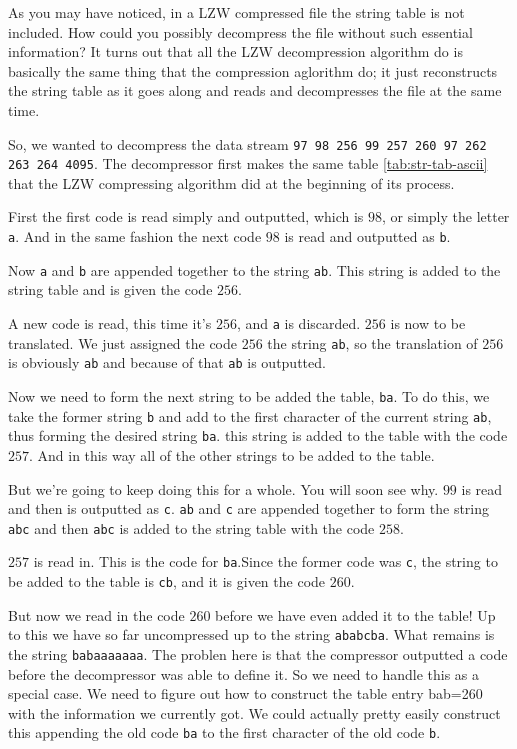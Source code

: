 \begin{refsection}
As you may have noticed, in a LZW compressed file the string table is
not included. How could you possibly decompress the file without such
essential information? It turns out that all the LZW decompression
algorithm do is basically the same thing that the compression aglorithm do; it
just reconstructs the string table as it goes along and  reads and decompresses the
file at the same time.

So, we wanted to decompress the data stream \texttt{97 98 256 99 257
  260 97 262 263 264 4095}. The decompressor first makes the same
table \ref{tab:str-tab-ascii}  that the LZW compressing algorithm did at the beginning of
its process.

First the first code is read simply and outputted, which is $98$, or
simply the letter \texttt{a}. And in the same fashion the next code
$98$ is read and outputted as \texttt{b}.

Now \texttt{a} and \texttt{b} are appended together to the string
\texttt{ab}. This string is added to the string table and is given the
code $256$.

A new code is read, this time it's $256$, and \texttt{a} is
discarded. $256$ is now to be translated. We just assigned the code
$256$ the string \texttt{ab}, so the translation of $256$ is obviously
\texttt{ab} and because of that \texttt{ab} is outputted.

Now we need to form the next string to be added the table,
\texttt{ba}. To do this, we take the former string \texttt{b} and add
to the first character of the current string \texttt{ab}, thus forming
the desired string \texttt{ba}. this string is added to the table with
the code $257$. And in this way all of the other strings to be added
to the table.

But we're going to keep doing this for a whole. You will soon see
why. $99$ is read and then is outputted as \texttt{c}. \texttt{ab} and
\texttt{c} are appended together to form the string \texttt{abc} and then
\texttt{abc} is added to the string table with the code $258$.

$257$ is read in. This is the code for \texttt{ba}.Since the former
code was \texttt{c}, the string to be added to the table is
\texttt{cb}, and it is given the code $260$.

But now we read in the code $260$ before we have even added it to the
table! Up to this we have so far uncompressed up to the string
\texttt{ababcba}. What remains is the string \texttt{babaaaaaaa}. The
problen here is that the compressor outputted a code before the
decompressor was able to define it. So we need to handle this as a
special case. We need to figure out how to construct the table entry
bab=260 with the information we currently got. We could actually
pretty easily construct this appending the old code \texttt{ba} to the
first character of the old code \texttt{b}.


\end{refsection}
